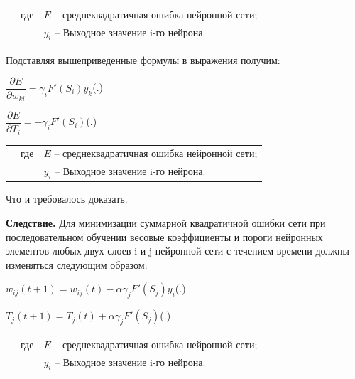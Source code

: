 	\begin{tabular}{p{}p{}p{}}
		& где  & $E$ {--} среднеквадратичная ошибка нейронной сети; \\
		&      & $y_{i}$ {--} Выходное значение i-го нейрона. \\
	\end{tabular}
	
	\par \redline Подставляя вышеприведенные формулы в выражения получим:
	
	\formulaspace \par \redline 
	$\dfrac{\partial E}{\partial w_{ki}} =  \gamma_{i} F'(S_{i}) y_k$\hfill (\thechaptercntr .\theformulacntr) \redline
	\formulaspace \addtocounter{formulacntr}{1}
	
	\formulaspace \par \redline 
	$\dfrac{\partial E}{\partial T_{i}} =  - \gamma_{i}F'(S_{i})$\hfill (\thechaptercntr .\theformulacntr) \redline
	\formulaspace \addtocounter{formulacntr}{1}
	
	\begin{tabular}{p{}p{}p{}}
		& где  & $E$ {--} среднеквадратичная ошибка нейронной сети; \\
		&      & $y_{i}$ {--} Выходное значение i-го нейрона. \\
	\end{tabular}
	
	\par \redline Что и требовалось доказать.
	
	\par \redline \textbf{Следствие.}  Для минимизации суммарной квадратичной ошибки сети при последовательном обучении весовые коэффициенты и пороги нейронных элементов любых двух слоев i и j нейронной сети с течением времени должны изменяться следующим образом:
	
	\formulaspace \par \redline 
	$w_{ij}(t+1) = w_{ij}(t) - \alpha \gamma_{j} F'(S_{j}) y_{i} $\hfill (\thechaptercntr .\theformulacntr) \redline
	\formulaspace \addtocounter{formulacntr}{1}
	
	\formulaspace \par \redline 
	$T_{j}(t+1) = T_{j}(t) + \alpha \gamma_{j} F'(S_{j}) $\hfill (\thechaptercntr .\theformulacntr) \redline
	\formulaspace \addtocounter{formulacntr}{1}
	
	\begin{tabular}{p{}p{}p{}}
		& где  & $E$ {--} среднеквадратичная ошибка нейронной сети; \\
		&      & $y_{i}$ {--} Выходное значение i-го нейрона. \\
	\end{tabular}
	
